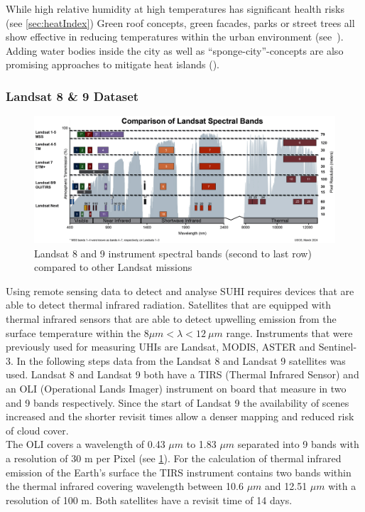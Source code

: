 \documentclass[12pt,a4paper, english,twoside]{article}
\begin{document}
      While high relative humidity at high temperatures has significant health risks (see \cref{sec:heatIndex})%
      Green roof concepts, green facades, parks or street trees all show effective in reducing temperatures within the urban environment (see~\cite{Ramamurthy2014, Feyisa2014, Dimoudi2003, Gartland2008}).
      Adding water bodies inside the city as well as ``sponge-city''-concepts are also promising approaches to mitigate heat islands (\cite{He2019}).
% 
    \subsubsection{Landsat 8 \& 9 Dataset}\label{sec:landsat}
      \begin{figure}[htbp]
       \begin{center}
         \includegraphics[width=\textwidth]{img/LandsatSpectralBands.png}
       \end{center}
       \caption{Landsat 8 and 9 instrument spectral bands (second to last row) compared to other Landsat missions\autocite{USGSWebsite}\label{fig:lsspectral}}
      \end{figure}
      \noindent
      Using remote sensing data to detect and analyse \gls{SUHI} requires devices that are able to detect thermal infrared radiation. 
      Satellites that are equipped with thermal infrared sensors that are able to detect upwelling emission from the surface temperature within the $ 8\mu m < \lambda < 12\ \mu m $ range. 
      Instruments that were previously used for measuring \glspl{UHI} are Landsat, MODIS, ASTER and Sentinel-3. 
      In the following steps data from the Landsat 8 and Landsat 9 satellites was used. 
      Landsat 8 and Landsat 9 both have a TIRS (Thermal Infrared Sensor) and an OLI (Operational Lands Imager) instrument on board that measure in two and 9 bands respectively.
      Since the start of Landsat 9 the availability of scenes increased and the shorter revisit times allow a denser mapping and reduced risk of cloud cover. \\ 
      The OLI covers a wavelength of 0.43 $\mu m$ to 1.83 $\mu m$ separated into 9 bands with a resolution of 30 m per Pixel (see \cref{fig:lsspectral}). 
      For the calculation of thermal infrared emission of the Earth's surface the TIRS instrument contains two bands within the thermal infrared covering wavelength between 10.6 $\mu m$ and 12.51 $\mu m$ with a resolution of 100 m.
      Both satellites have a revisit time of 14 days. 
%
\end{document}
